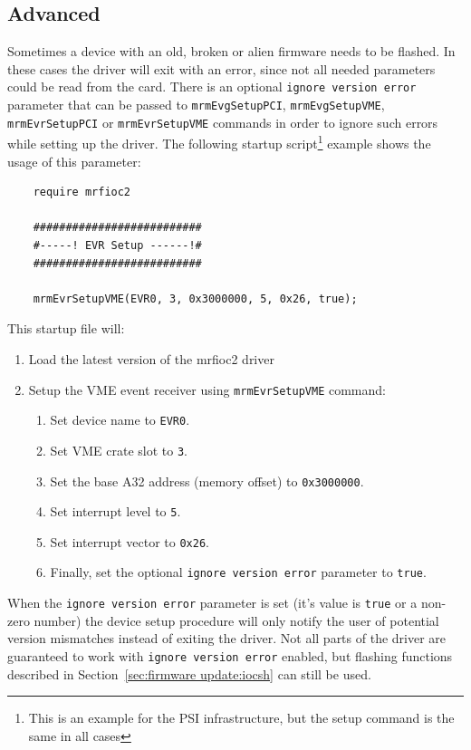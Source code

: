 \documentclass[12pt,a4paper]{article}
\begin{document}
\subsection{Advanced} \label{sec:firmware update:advanced}
Sometimes a device with an old, broken or alien firmware needs to be flashed. In these cases the driver will exit with an error, since not all needed parameters could be read from the card. There is an optional \texttt{ignore version error} parameter that can be passed to \texttt{mrmEvgSetupPCI}, \texttt{mrmEvgSetupVME}, \texttt{mrmEvrSetupPCI} or \texttt{mrmEvrSetupVME} commands in order to ignore such errors while setting up the driver. The following startup script\footnote{This is an example for the PSI infrastructure, but the setup command is the same in all cases} example shows the usage of this parameter:
\begin{verbatim}
	require mrfioc2
	
	##########################
	#-----! EVR Setup ------!#
	##########################
	
	mrmEvrSetupVME(EVR0, 3, 0x3000000, 5, 0x26, true);
\end{verbatim}
This startup file will:
\begin{enumerate}
\item Load the latest version of the mrfioc2 driver
\item Setup the VME event receiver using \texttt{mrmEvrSetupVME} command:
	\begin{enumerate}
	\item Set device name to \texttt{EVR0}.
	\item Set VME crate slot to \texttt{3}.
	\item Set the base A32 address (memory offset) to \texttt{0x3000000}.
	\item Set interrupt level to \texttt{5}.
	\item Set interrupt vector to \texttt{0x26}.
	\item Finally, set the optional \texttt{ignore version error} parameter to \texttt{true}.
	\end{enumerate}
\end{enumerate}
When the \texttt{ignore version error} parameter is set (it's value is \texttt{true} or a non-zero number) the device setup procedure will only notify the user of potential version mismatches instead of exiting the driver. Not all parts of the driver are guaranteed to work with \texttt{ignore version error} enabled, but flashing functions described in Section~\ref{sec:firmware update:iocsh} can still be used.
\end{document}
